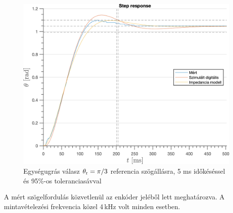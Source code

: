 \begin{figure}[b!]
    \begin{center}
    \includegraphics[width=\textwidth]{images/step_response_experiment0005.png}
    \caption{Egységugrás válasz \(\theta_{\mathrm{r}} = \pi/3\) referencia szögállásra, 5 ms időkéséssel és 95\%-os toleranciasávval}\label{fig:step_response_experiment0005}
    \end{center}
\end{figure}

A mért szögelfordulás közvetlenül az enkóder jeléből lett meghatározva. A mintavételezési frekvencia közel 4\,kHz volt 
minden esetben. 

